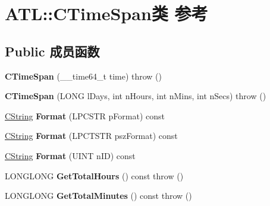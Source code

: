 \hypertarget{class_a_t_l_1_1_c_time_span}{}\section{A\+TL\+:\+:C\+Time\+Span类 参考}
\label{class_a_t_l_1_1_c_time_span}
\subsection*{Public 成员函数}
\begin{DoxyCompactItemize}
\item 
\mbox{\label{class_a_t_l_1_1_c_time_span_a2d5474308f3e461abfb415b926c1e43c}} 
{\bfseries C\+Time\+Span} (\+\_\+\+\_\+time64\+\_\+t time)  throw ()
\item 
\mbox{\label{class_a_t_l_1_1_c_time_span_ac6e0169d26707f3edc402b27938bdf73}} 
{\bfseries C\+Time\+Span} (L\+O\+NG l\+Days, int n\+Hours, int n\+Mins, int n\+Secs)  throw ()
\item 
\mbox{\label{class_a_t_l_1_1_c_time_span_af0bd9b31d06877f438c0c017b2136b23}} 
\hyperlink{class_a_t_l_1_1_c_string_t}{C\+String} {\bfseries Format} (L\+P\+C\+S\+TR p\+Format) const
\item 
\mbox{\label{class_a_t_l_1_1_c_time_span_aa69fd14b63eb3a5f80500cfc6f3a7144}} 
\hyperlink{class_a_t_l_1_1_c_string_t}{C\+String} {\bfseries Format} (L\+P\+C\+T\+S\+TR psz\+Format) const
\item 
\mbox{\label{class_a_t_l_1_1_c_time_span_a312918c6fee7574bfc679b53fc352f36}} 
\hyperlink{class_a_t_l_1_1_c_string_t}{C\+String} {\bfseries Format} (U\+I\+NT n\+ID) const
\item 
\mbox{\label{class_a_t_l_1_1_c_time_span_abd3d432afad303db84d29e64e70fd1ab}} 
L\+O\+N\+G\+L\+O\+NG {\bfseries Get\+Total\+Hours} () const  throw ()
\item 
\mbox{\label{class_a_t_l_1_1_c_time_span_a6091662d1bc6068ee68f2119932d06b2}} 
L\+O\+N\+G\+L\+O\+NG {\bfseries Get\+Total\+Minutes} () const  throw ()

\end{DoxyCompactItemize}
